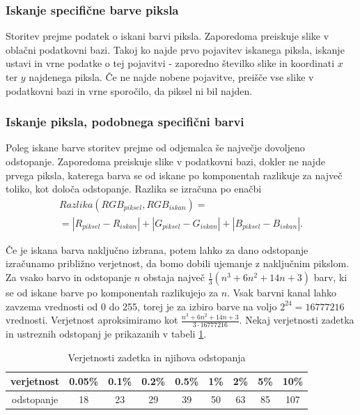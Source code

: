 \subsubsection{Iskanje specifične barve piksla}

Storitev prejme podatek o iskani barvi piksla.
Zaporedoma preiskuje slike v oblačni podatkovni bazi.
Takoj ko najde prvo pojavitev iskanega piksla, iskanje ustavi in vrne podatke o tej pojavitvi - zaporedno številko slike in koordinati $x$ ter $y$ najdenega piksla.
Če ne najde nobene pojavitve, preišče vse slike v podatkovni bazi in vrne sporočilo, da piksel ni bil najden.

\subsubsection{Iskanje piksla, podobnega specifični barvi}

Poleg iskane barve storitev prejme od odjemalca še največje dovoljeno odstopanje.
Zaporedoma preiskuje slike v podatkovni bazi, dokler ne najde prvega piksla, katerega barva se od iskane po komponentah razlikuje za največ toliko, kot določa odstopanje.
Razlika se izračuna po enačbi
\begin{multline} \label{1_eq_odstopanje}
Razlika(RGB_{piksel}, RGB_{iskan}) = \\ = |R_{piksel} - R_{iskan}| + |G_{piksel} - G_{iskan}| + |B_{piksel} - B_{iskan}|.
\end{multline}

Če je iskana barva naključno izbrana, potem lahko za dano odstopanje izračunamo približno verjetnost, da bomo dobili ujemanje z naključnim pikslom.
Za vsako barvo in odstopanje $n$ obstaja največ $\frac{1}{3}(n^3 + 6n^2 + 14n + 3)$ barv, ki se od iskane barve po komponentah razlikujejo za $n$.
Vsak barvni kanal lahko zavzema vrednosti od 0 do 255, torej je za izbiro barve na voljo $2^{24} = 16777216$ vrednosti.
Verjetnost aproksimiramo kot $\frac{n^3 + 6n^2 + 14n + 3}{3 \cdot 16777216}$.
Nekaj verjetnosti zadetka in ustreznih odstopanj je prikazanih v tabeli \ref{1_tab_probabilites}. \\ %

\begin{table}[ht]
\centering
\begin{tabular}{c|c c c c c c c c} 
verjetnost & 0.05\% & 0.1\% & 0.2\% & 0.5\% & 1\% & 2\% & 5\% & 10\% \\
\hline
odstopanje & 18 & 23 & 29 & 39 & 50 & 63 & 85 & 107
\end{tabular}
\caption{Verjetnosti zadetka in njihova odstopanja}
\label{1_tab_probabilites}
\end{table}

